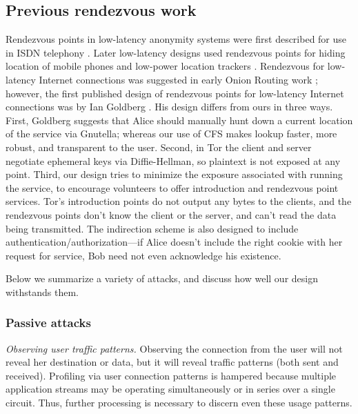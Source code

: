 \documentclass[times,10pt,twocolumn]{article}
\begin{document}
\subsection{Previous rendezvous work}

Rendezvous points in low-latency anonymity systems were first
described for use in ISDN telephony \cite{isdn-mixes,jerichow-jsac98}.
Later low-latency designs used rendezvous points for hiding location
of mobile phones and low-power location trackers
\cite{federrath-ih96,reed-protocols97}.  Rendezvous for low-latency
Internet connections was suggested in early Onion Routing work
\cite{or-ih96}; however, the first published design of rendezvous
points for low-latency Internet connections was by Ian Goldberg
\cite{ian-thesis}. His design differs from
ours in three ways. First, Goldberg suggests that Alice should manually
hunt down a current location of the service via Gnutella; whereas our
use of CFS makes lookup faster, more robust, and transparent to the
user. Second, in Tor the client and server negotiate ephemeral keys
via Diffie-Hellman, so plaintext is not exposed at any point. Third,
our design tries to minimize the exposure associated with running the
service, to encourage volunteers to offer introduction and rendezvous
point services. Tor's introduction points do not output any bytes to the
clients, and the rendezvous points don't know the client or the server,
and can't read the data being transmitted. The indirection scheme is
also designed to include authentication/authorization---if Alice doesn't
include the right cookie with her request for service, Bob need not even
acknowledge his existence.

\label{sec:attacks}


  
Below we summarize a variety of attacks, and discuss how well our
design withstands them.

\subsubsection*{Passive attacks}

\emph{Observing user traffic patterns.} Observing the connection
from the user will not reveal her destination or data, but it will
reveal traffic patterns (both sent and received). Profiling via user
connection patterns is hampered because multiple application streams may
be operating simultaneously or in series over a single circuit. Thus,
further processing is necessary to discern even these usage patterns.
  
\end{document}
